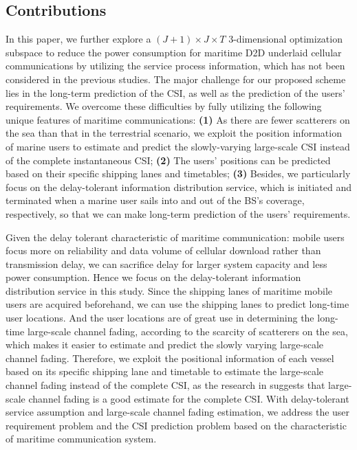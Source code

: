 \documentclass{ieeeaccess}
\begin{document}
\subsection{Contributions}
In this paper, we further explore a ${\left( {J + 1} \right) \times J \times T}$ 3-dimensional optimization subspace to reduce the power consumption for maritime D2D underlaid cellular communications by utilizing the service process information, which has not been considered in the previous studies.
The major challenge for our proposed scheme lies in the long-term prediction of the CSI, as well as the prediction of the users' requirements. We overcome these difficulties by fully utilizing the following unique features of maritime communications:
\textbf{(1)} As there are fewer scatterers on the sea than that in the terrestrial scenario, we exploit the position information of marine users to estimate and predict the slowly-varying large-scale CSI instead of the complete instantaneous CSI;
\textbf{(2)} The users' positions can be predicted based on their specific shipping lanes and timetables;
\textbf{(3)} Besides, we particularly focus on the delay-tolerant information distribution service, which is initiated and terminated when a marine user sails into and out of the BS's coverage, respectively, so that we can make long-term prediction of the users' requirements.


Given the delay tolerant characteristic of maritime communication: mobile users focus more on reliability and data volume of cellular download rather than transmission delay, we can sacrifice delay for larger system capacity and less power consumption. Hence we focus on the delay-tolerant information distribution service in this study.
Since the shipping lanes of maritime mobile users are acquired beforehand, we can use the shipping lanes to predict long-time user locations. And the user locations are of great use in determining the long-time large-scale channel fading, according to the scarcity of scatterers on the sea, which makes it easier to estimate and predict the slowly varying large-scale channel fading. Therefore, we exploit the positional information of each vessel based on its specific shipping lane and timetable to estimate the large-scale channel fading instead of the complete CSI, as the research in \cite{p120} suggests that large-scale channel fading is a good estimate for the complete CSI.%
With delay-tolerant service assumption and large-scale channel fading estimation, we address the user requirement problem and the CSI prediction problem based on the characteristic of maritime communication system.
\end{document}
